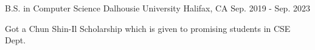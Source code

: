 

\begin{cventries}

  \cventry
    {B.S. in Computer Science} %
    {Dalhousie University} %
    {Halifax, CA} %
    {Sep. 2019 - Sep. 2023} %
    {
      \begin{cvitems} %
        \item {Got a Chun Shin-Il Scholarship which is given to promising students in CSE Dept.}
      \end{cvitems}
    }

\end{cventries}
